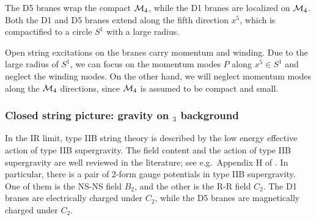 \documentclass[11pt,a4paper]{article}
\newcommand{\ads}[1]{\text{AdS}\ensuremath{_{#1}}}
\begin{document}
	The D5 branes wrap the compact $\mathcal{M}_4$, while the D1 branes are localized on $\mathcal{M}_4$. Both the D1 and D5 branes extend along the fifth direction $x^5$, which is compactified to a circle $S^1$ with a large radius. 
	
	Open string excitations on the branes carry momentum and winding. Due to the large radius of $S^1$, we can focus on the momentum modes $P$ along $x^5 \in S^1$ and neglect the winding modes. On the other hand, we will neglect momentum modes along the $\mathcal{M}_4$ directions, since $\mathcal{M}_4$ is assumed to be compact and small. 
	
\subsubsection{Closed string picture: gravity on \ads{3} background}
	In the IR limit, type IIB string theory is described by the low energy effective action of type IIB supergravity. The field content and the action of type IIB supergravity are well reviewed in the literature; see e.g.\ Appendix H of \cite{Kiritsis:1997hj}. In particular, there is a pair of 2-form gauge potentials in type IIB supergravity. One of them is the NS-NS field $B_2$, and the other is the R-R field $C_2$. 
	The D1 branes are electrically charged under $C_2$, while the D5 branes are magnetically charged under $C_2$. 
	
\end{document}
